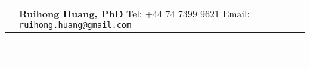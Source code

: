 \documentclass[a4paper,10pt]{article}
\begin{document}
\newcommand{\HU}[0]{Humboldt Universit\"at zu Berlin}
\fancyhf{}
\renewcommand{\headrulewidth}{0pt}
\renewcommand{\footrulewidth}{1pt}
\renewcommand\footrule{\begin{minipage}{1\textwidth}
\hrule width \hsize height 2pt \kern 1mm \hrule width \hsize   
\end{minipage}\par}
\pagestyle{fancy}
\lfoot{\monthyear\today}
\begin{tabular}[h]{p{}p{}}
 &\vspace{1pt}\large{\textbf{Ruihong Huang, PhD}\newline
  \vspace{-8pt} \newline
Tel: +44 74 7399 9621  \newline
Email: \verb|ruihong.huang@gmail.com| } \\
\end{tabular}\\
\rule[5pt]{1\textwidth}{1pt}\par
\setlength{\tabcolsep}{10pt}
\setlength{\extrarowheight}{7pt}
\end{document}
